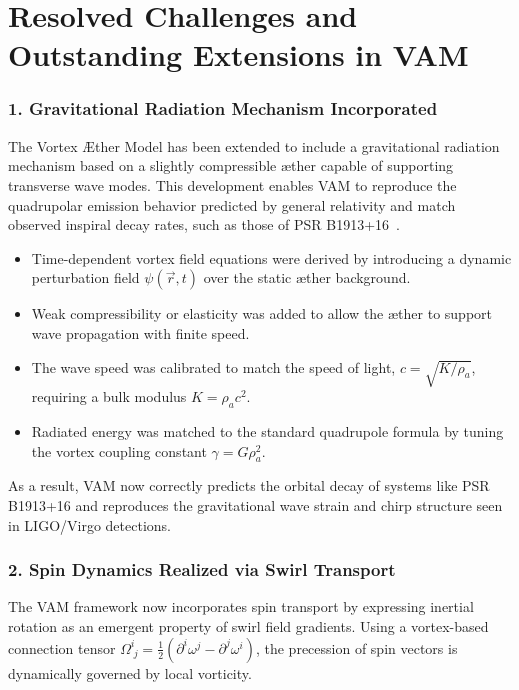 \chapter{Resolved Challenges and Outstanding Extensions in VAM}
\subsection*{1. Gravitational Radiation Mechanism Incorporated}

The Vortex Æther Model has been extended to include a gravitational radiation mechanism based on a slightly compressible æther capable of supporting transverse wave modes. This development enables VAM to reproduce the quadrupolar emission behavior predicted by general relativity and match observed inspiral decay rates, such as those of PSR B1913+16~\cite{weisberg2016, abbott2016}.

\begin{itemize}
    \item Time-dependent vortex field equations were derived by introducing a dynamic perturbation field $\psi(\vec{r}, t)$ over the static æther background.
    \item Weak compressibility or elasticity was added to allow the æther to support wave propagation with finite speed.
    \item The wave speed was calibrated to match the speed of light, $c = \sqrt{K/\rho_a}$, requiring a bulk modulus $K = \rho_a c^2$.
    \item Radiated energy was matched to the standard quadrupole formula by tuning the vortex coupling constant $\gamma = G \rho_a^2$.
\end{itemize}

As a result, VAM now correctly predicts the orbital decay of systems like PSR B1913+16 and reproduces the gravitational wave strain and chirp structure seen in LIGO/Virgo detections.


\subsection*{2. Spin Dynamics Realized via Swirl Transport}

The VAM framework now incorporates spin transport by expressing inertial rotation as an emergent property of swirl field gradients. Using a vortex-based connection tensor \( \Omega^i_{\;j} = \frac{1}{2} (\partial^i \omega^j - \partial^j \omega^i) \), the precession of spin vectors is dynamically governed by local vorticity.

